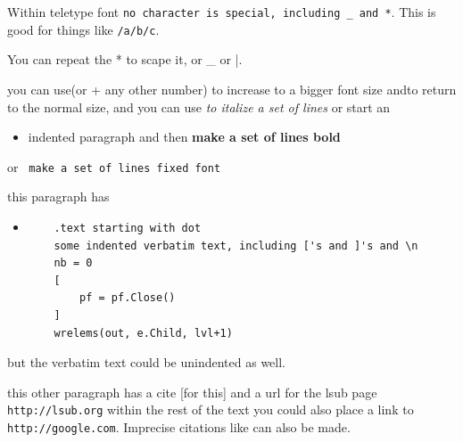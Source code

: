 \documentclass[a4paper]{article}
\begin{document}
Within teletype font \texttt{no character is special, including \_
and *}. This is good for things like \texttt{/a/b/c}.

You can repeat the * to scape it, or \_ or |.

you can use\Large (or + any other number) to increase to a bigger
font size and\normalsize to return to the normal size, and you can
use
\textit{%
to italize a set of lines
}%
or start an
\begin{itemize}
\item[]
    indented paragraph and then
\textbf{%
    make a set of lines bold
}%
\end{itemize}
or
\texttt{%
make a set of lines fixed font
}%

this paragraph has
\begin{itemize}
\item[]
    \begin{verbatim}
    .text starting with dot
    some indented verbatim text, including ['s and ]'s and \n
    nb = 0
    [
        pf = pf.Close()
    ]
    wrelems(out, e.Child, lvl+1)
    \end{verbatim}
\end{itemize}
but the verbatim text could be unindented as well.

this other paragraph has a cite [for this] and a url for the lsub page
\verb|http://lsub.org| within the rest of the text you could also
place a link to \verb|http://google.com|. Imprecise citations like
\cite{bib1,bib2,bib2} can also be made.
\end{document}
